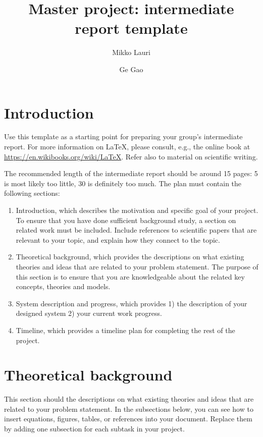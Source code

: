 \documentclass[a4paper,11pt,english]{article}
\begin{document}
\title{Master project: intermediate report template}
\author{Mikko Lauri \and Ge Gao}
	
\maketitle 

\section{Introduction}
Use this template as a starting point for preparing your group's intermediate report.
For more information on \LaTeX, please consult, e.g., the online book at \url{https://en.wikibooks.org/wiki/LaTeX}.
Refer also to material on scientific writing.

The recommended length of the intermediate report should be around 15 pages: 5 is most likely too little, 30 is definitely too much.
The plan must contain the following sections:
\begin{enumerate}
	\item Introduction, which describes the motivation and specific goal of your project. To ensure that you have done sufficient background study, a section on related work must be included. Include references to scientific papers that are relevant to your topic, and explain how they connect to the topic. 
	\item Theoretical background, which provides the descriptions on what existing theories and ideas that are related to your problem statement. The purpose of this section is to ensure that you are knowledgeable about the related key concepts, theories and models. 
	\item System description and progress, which provides 1) the description of your designed system 2) your current work progress.
	\item Timeline, which provides a timeline plan for completing the rest of the project.
\end{enumerate}

\section{Theoretical background}
This section should the descriptions on what existing theories and ideas that are related to your problem statement.
In the subsections below, you can see how to insert equations, figures, tables, or references into your document.
Replace them by adding one subsection for each subtask in your project.
\end{document}
